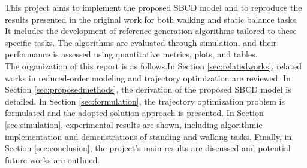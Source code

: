 \documentclass[main.tex]{subfiles}
\begin{document}
This project aims to implement the proposed SBCD model and to reproduce the results presented in the original work for both walking and static balance tasks. It includes the development of reference generation algorithms tailored to these specific tasks. The algorithms are evaluated through simulation, and their performance is assessed using quantitative metrics, plots, and tables.\\
\newline
The organization of this report is as follows.In Section \ref{sec:relatedworks}, related works in reduced-order modeling and trajectory optimization are reviewed. In Section \ref{sec:proposedmethods}, the derivation of the proposed SBCD model is detailed. In Section \ref{sec:formulation}, the trajectory optimization problem is formulated and the adopted solution approach is presented. In Section \ref{sec:simulation}, experimental results are shown, including algorithmic implementation and demonstrations of standing and walking tasks. Finally, in Section \ref{sec:conclusion}, the project's main results are discussed and potential future works are outlined.
\end{document}
